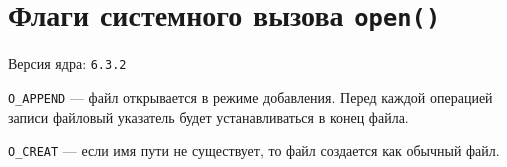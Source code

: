 
%

%

%

%

%

%

%

%

%


\clearpage
\section*{Флаги системного вызова \texttt{open()}}

Версия ядра: \texttt{6.3.2}

\texttt{O\_APPEND} --- файл открывается в режиме добавления. Перед каждой
операцией записи файловый указатель будет устанавливаться в конец файла.

\texttt{O\_CREAT} --- если имя пути не существует, то файл создается как обычный файл.

